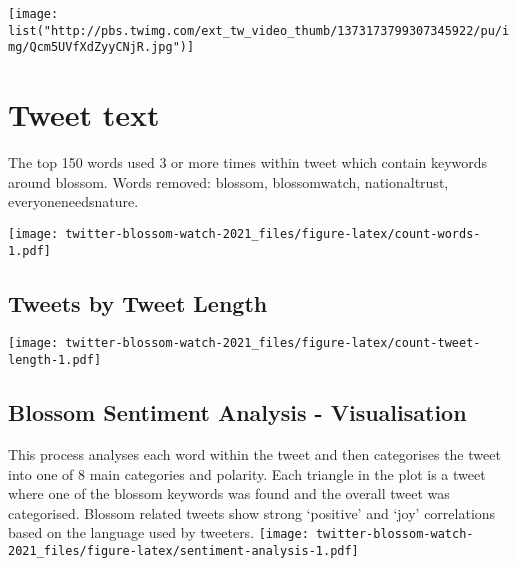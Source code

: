 \documentclass[
]{article}
\begin{document}
\texttt{[image: list("http://pbs.twimg.com/ext\_tw\_video\_thumb/1373173799307345922/pu/img/Qcm5UVfXdZyyCNjR.jpg")]}

\hypertarget{tweet-text}{%
\section{Tweet text}\label{tweet-text}}

The top 150 words used 3 or more times within tweet which contain
keywords around blossom. Words removed: blossom, blossomwatch,
nationaltrust, everyoneneedsnature.

\texttt{[image: twitter-blossom-watch-2021\_files/figure-latex/count-words-1.pdf]}

\hypertarget{tweets-by-tweet-length}{%
\subsection{Tweets by Tweet Length}\label{tweets-by-tweet-length}}

\texttt{[image: twitter-blossom-watch-2021\_files/figure-latex/count-tweet-length-1.pdf]}

\hypertarget{blossom-sentiment-analysis---visualisation}{%
\subsection{Blossom Sentiment Analysis -
Visualisation}\label{blossom-sentiment-analysis---visualisation}}

This process analyses each word within the tweet and then categorises
the tweet into one of 8 main categories and polarity. Each triangle in
the plot is a tweet where one of the blossom keywords was found and the
overall tweet was categorised. Blossom related tweets show strong
`positive' and `joy' correlations based on the language used by
tweeters.
\texttt{[image: twitter-blossom-watch-2021\_files/figure-latex/sentiment-analysis-1.pdf]}
\end{document}

